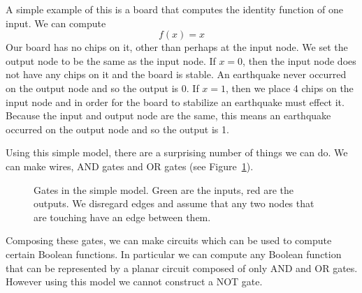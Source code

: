 \documentclass[runningheads,a4paper]{llncs}
\begin{document}
A simple example of this is a board that computes the identity function of one input. We can compute 
\begin{equation*}
f(x) = x
\end{equation*}
Our board has no chips on it, other than perhaps at the input node. We set the output node to be the same as the input node. If $x = 0$, then the input node does not have any chips on it and the board is stable. An earthquake never occurred on the output node and so the output is 0. If $x = 1$, then we place 4 chips on the input node and in order for the board to stabilize an earthquake must effect it. Because the input and output node are the same, this means an earthquake occurred on the output node and so the output is 1.


Using this simple model, there are a surprising number of things we can do. We can make wires, AND gates and OR gates (see Figure~\ref{fig:simplegates}). 

\begin{figure}
\centering
{}
\qquad\qquad
{}
\qquad\qquad
{}
\caption{Gates in the simple model. Green are the inputs, red are the outputs. We disregard edges and assume that any two nodes that are touching have an edge between them.}
\label{fig:simplegates}
\end{figure}

Composing these gates, we can make circuits which can be used to compute certain Boolean functions. In particular we can compute any Boolean function that can be represented by a planar circuit composed of only AND and OR gates. However using this model we cannot construct a NOT gate.  
\end{document}
